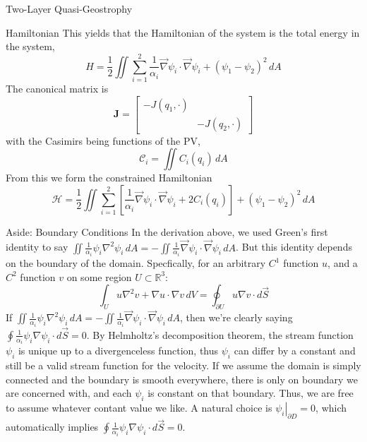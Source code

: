 \documentclass[12pt]{article}
\begin{document}
\begin{section}{Two-Layer Quasi-Geostrophy}
\begin{subsection}{Hamiltonian}
        This yields that the Hamiltonian of the system is the total energy in the system,
        $$
        H = \frac12 \iint \sum_{i=1}^2 \frac{1}{\alpha_i}\vec\nabla \psi_i \cdot \vec\nabla \psi_i + (\psi_1 - \psi_2)^2 \, dA
        $$
        The canonical matrix is
        $$
        \mathbf{J} = \left[\begin{array}{cc}
        -J(q_1, \cdot) & \\
        & -J(q_2, \cdot)
        \end{array}\right]
        $$
        with the Casimirs being functions of the PV,
        $$
        \mathcal{C}_i = \iint C_i(q_i) \, dA
        $$
        From this we form the constrained Hamiltonian
        \begin{equation}
            \mathcal{H} = \frac12 \iint \sum_{i=1}^2 \left[ \frac{1}{\alpha_i} \vec\nabla \psi_i \cdot \vec\nabla \psi_i + 2C_i(q_i) \right]+ (\psi_1 - \psi_2)^2 \, dA
            \label{eqn:qg_tl_h}
        \end{equation}

        \begin{subsubsection}{Aside: Boundary Conditions}
            In the derivation above, we used Green's first identity to say $\iint \frac{1}{\alpha_i}\psi_i \nabla^2 \psi_i \, dA = - \iint \frac{1}{\alpha_i} \vec\nabla\psi_i \cdot \vec\nabla\psi_i \, dA$. But this identity depends on the boundary of the domain. Specfically, for an arbitrary $C^1$ function $u$, and a $C^2$ function $v$ on some region $U \subset \mathbb{R}^3$:
            $$
            \int_U u \nabla^2 v + \nabla u \cdot \nabla v \, dV = \oint_{\partial U} u \nabla v \cdot d \vec S
            $$
            If $\iint \frac{1}{\alpha_i}\psi_i \nabla^2 \psi_i \, dA = - \iint \frac{1}{\alpha_i} \vec\nabla\psi_i \cdot \vec\nabla\psi_i \, dA$, then we're clearly saying $\oint \frac{1}{\alpha_i}\psi_i \nabla \psi_i\cdot d \vec S = 0$. By Helmholtz's decomposition theorem, the stream function $\psi_i$ is unique up to a divergenceless function, thus $\psi_i$ can differ by a constant and still be a valid stream function for the velocity. If we assume the domain is simply connected and the boundary is smooth everywhere, there is only on boundary we are concerned with, and each $\psi_i$ is constant on that boundary. Thus, we are free to assume whatever contant value we like. A natural choice is $\left. \psi_i \right|_{\partial D} = 0$, which automatically implies $\oint \frac{1}{\alpha_i}\psi_i \nabla \psi_i \cdot d \vec S = 0$.


\end{subsubsection}
\end{subsection}
\end{section}
\end{document}
